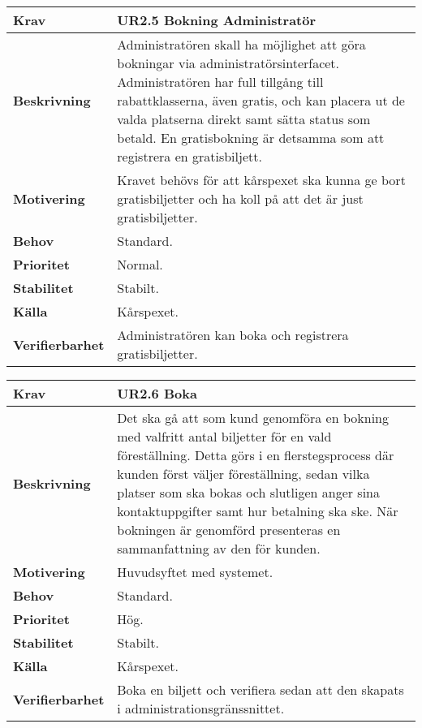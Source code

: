 \documentclass[a4paper, twoside, 11pt, titlepage]{article}
\begin{document}
		\begin{tabular} { p{2.6cm} p{12.5cm} }
			\hline
			\sffamily\textbf{Krav} & \sffamily\textbf{UR2.5 Bokning Administratör  } \\
			\hline
			\sffamily\textbf{Beskrivning} & Administratören skall ha möjlighet att göra bokningar via administratörsinterfacet. Administratören har full tillgång till rabattklasserna, även gratis, och kan placera ut de valda platserna direkt samt sätta status som betald. En gratisbokning är detsamma som att registrera en gratisbiljett.  \\
			\hline
			\sffamily\textbf{Motivering} & Kravet behövs för att kårspexet ska kunna ge bort gratisbiljetter och ha koll på att det är just gratisbiljetter.  \\
			\hline
			\sffamily\textbf{Behov} & Standard.  \\
			\hline
			\sffamily\textbf{Prioritet} & Normal.  \\
			\hline
			\sffamily\textbf{Stabilitet} & Stabilt.  \\
			\hline
			\sffamily\textbf{Källa} & Kårspexet.  \\
			\hline
			\sffamily\textbf{Verifierbarhet} & Administratören kan boka och registrera gratisbiljetter.  \\
			\hline
		\end{tabular}
		\vspace{6mm}

		\begin{tabular} { p{2.6cm} p{12.5cm} }
			\hline
			\sffamily\textbf{Krav} & \sffamily\textbf{UR2.6 Boka  } \\
			\hline
			\sffamily\textbf{Beskrivning} & Det ska gå att som kund genomföra en bokning med valfritt antal biljetter för en vald föreställning. Detta görs i en flerstegsprocess där kunden först väljer föreställning, sedan vilka platser som ska bokas och slutligen anger sina kontaktuppgifter samt hur betalning ska ske. När bokningen är genomförd presenteras en sammanfattning av den för kunden.  \\
			\hline
			\sffamily\textbf{Motivering} & Huvudsyftet med systemet.  \\
			\hline
			\sffamily\textbf{Behov} & Standard.  \\
			\hline
			\sffamily\textbf{Prioritet} & Hög.  \\
			\hline
			\sffamily\textbf{Stabilitet} & Stabilt.  \\
			\hline
			\sffamily\textbf{Källa} & Kårspexet.  \\
			\hline
			\sffamily\textbf{Verifierbarhet} & Boka en biljett och verifiera sedan att den skapats i administrationsgränssnittet.  \\
			\hline
		\end{tabular}
		\vspace{6mm}
\end{document}
